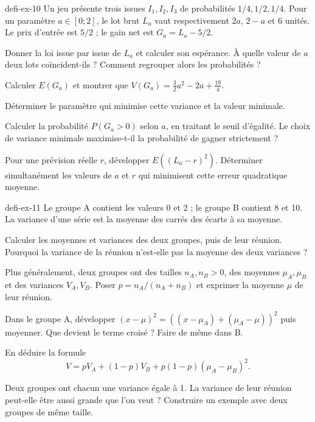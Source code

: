\begin{blocEdition}{defi-ex-10}
Un jeu présente trois issues $I_1,I_2,I_3$ de probabilités $1/4,1/2,1/4$.
Pour un paramètre $a\in[0;2]$, le lot brut $L_a$ vaut respectivement
$2a$, $2-a$ et $6$ unités. Le prix d'entrée est $5/2$ ; le gain net est $G_a=L_a-5/2$.
\begin{questions}
\item Donner la loi issue par issue de $L_a$ et calculer son espérance.
À quelle valeur de $a$ deux lots coïncident-ils ? Comment regrouper alors les probabilités ?
\item Calculer $E(G_a)$ et montrer que
$V(G_a)=\frac32a^2-2a+\frac{19}{4}$.
\item Déterminer le paramètre qui minimise cette variance et la valeur minimale.
\item Calculer la probabilité $P(G_a>0)$ selon $a$, en traitant le seuil d'égalité.
Le choix de variance minimale maximise-t-il la probabilité de gagner strictement ?
\item Pour une prévision réelle $r$, développer $E((L_a-r)^2)$.
Déterminer simultanément les valeurs de $a$ et $r$ qui minimisent cette erreur quadratique moyenne.
\end{questions}
\label{figedition-defi-ex-10-1}
\end{blocEdition}

\begin{blocEdition}{defi-ex-11}
Le groupe A contient les valeurs 0 et 2 ; le groupe B contient 8 et 10.
La variance d'une série est la moyenne des carrés des écarts à sa moyenne.
\begin{questions}
\item Calculer les moyennes et variances des deux groupes, puis de leur réunion.
Pourquoi la variance de la réunion n'est-elle pas la moyenne des deux variances ?
\item Plus généralement, deux groupes ont des tailles $n_A,n_B>0$, des moyennes
$\mu_A,\mu_B$ et des variances $V_A,V_B$. Poser $p=n_A/(n_A+n_B)$ et exprimer
la moyenne $\mu$ de leur réunion.
\item Dans le groupe A, développer
$(x-\mu)^2=((x-\mu_A)+(\mu_A-\mu))^2$ puis moyenner.
Que devient le terme croisé ? Faire de même dans B.
\item En déduire la formule
\[V=pV_A+(1-p)V_B+p(1-p)(\mu_A-\mu_B)^2.\]
\item Deux groupes ont chacun une variance égale à 1. La variance de leur réunion
peut-elle être aussi grande que l'on veut ? Construire un exemple avec deux groupes de même taille.
\end{questions}
\label{figedition-defi-ex-11-1}
\end{blocEdition}

